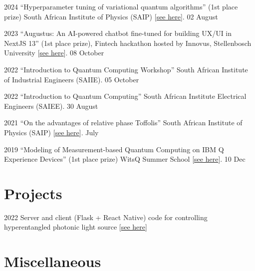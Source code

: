 \documentclass[10pt]{extreport}
\begin{document}
\begin{tablist}
	\item[2024] \tab{}\enquote{Hyperparameter tuning of variational quantum algorithms}  (1st place prize) South
		African Institute of Physics (SAIP) [\href{https://github.com/Unathi-Skosana/posters-n-presentations/blob/main/presentations/saip2024/saip2024_final.pdf}{see here}]. 02 August
	\item[2023]  \tab{} \enquote{Augustus: An AI-powered chatbot fine-tuned for building UX/UI in NextJS 13} (1st place prize), Fintech hackathon hosted by Innovus, Stellenbosch University [\href{https://github.com/Unathi-Skosana/posters-n-presentations/blob/main/presentations/su-innovus-hackathon-2023/export/Augustus-SU-hackathon-presentation.pdf}{see here}]. 08 October
	\item[2022] \tab{}\enquote{Introduction to Quantum Computing Workshop} South African Institute of Industrial Engineers (SAIIE). 05 October
	\item[2022] \tab{}\enquote{Introduction to Quantum Computing} South African Institute Electrical Engineers (SAIEE). 30 August
	\item[2021] \tab{}\enquote{On the advantages of relative phase Toffolis} South
	African Institute of Physics (SAIP) [\href{https://github.com/Unathi-Skosana/posters-n-presentations/blob/main/posters/saip-2021/release/poster.pdf}{see here}].  July
	\item[2019] \tab{}\enquote{Modeling of Measurement-based Quantum Computing on
		IBM Q Experience Devices}  (1st place prize) WitsQ Summer School
		[\href{https://github.com/Unathi-Skosana/posters-n-presentations/blob/main/posters/witsq-summer-school-2019/release/poster.pdf}{see here}]. 10 Dec
\end{tablist}

\section*{Projects}

\begin{tablist}
	\item[2022] \tab{}Server and client (Flask + React Native) code for controlling hyperentangled photonic light source [\href{https://github.com/Unathi-Skosana/hyperentangled-photons-masters-experiment}{see here}]
\end{tablist}

\section*{Miscellaneous}
\end{document}
